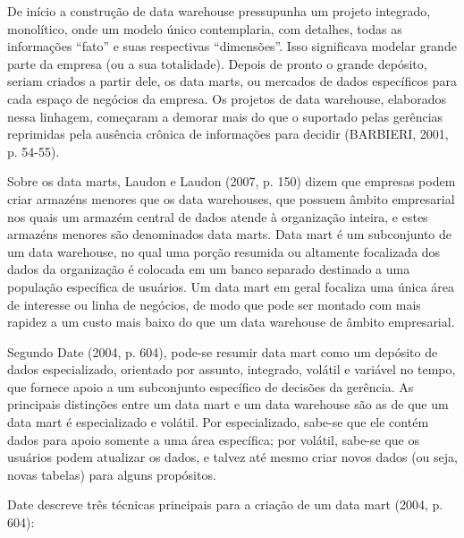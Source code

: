 \documentclass[a4paper]{article}
\begin{document}
{
\textsf{De in\'icio a constru\c{c}\~ao de data warehouse pressupunha um projeto integrado, monol\'itico, onde um modelo
\'unico contemplaria, com detalhes, todas as informa\c{c}\~oes ``fato'' e suas respectivas ``dimens\~oes''. Isso
significava modelar grande parte da empresa (ou a sua totalidade). Depois de pronto o grande dep\'osito, seriam criados
a partir dele, os data marts, ou mercados de dados espec\'ificos para cada espa\c{c}o de neg\'ocios da empresa. Os
projetos de data warehouse, elaborados nessa linhagem, come\c{c}aram a demorar mais do que o suportado pelas
ger\^encias reprimidas pela aus\^encia cr\^onica de informa\c{c}\~oes para decidir (BARBIERI, 2001, p. 54-55).}}

{
\textsf{Sobre os data marts, Laudon e Laudon (2007, p. 150) dizem que empresas podem criar armaz\'ens menores que os
data warehouses, que possuem \^ambito empresarial nos quais um armaz\'em central de dados atende \`a organiza\c{c}\~ao
inteira, e estes }\textsf{armaz\'ens menores s\~ao denominados data marts. Data mart \'e um subconjunto de um data
warehouse, no qual uma por\c{c}\~ao resumida ou altamente focalizada dos dados da organiza\c{c}\~ao \'e colocada em um
banco separado destinado a uma popula\c{c}\~ao espec\'ifica de usu\'arios. Um data mart em geral focaliza uma \'unica
\'area de interesse ou linha de neg\'ocios, de modo que pode ser montado com mais rapidez a um custo mais baixo do que
um data warehouse de \^ambito empresarial.}}

{\sffamily
Segundo Date (2004, p. 604), pode-se resumir data mart como um dep\'osito de dados especializado, orientado por assunto,
integrado, vol\'atil e vari\'avel no tempo, que fornece apoio a um subconjunto espec\'ifico de decis\~oes da
ger\^encia. As principais distin\c{c}\~oes entre um data mart e um data warehouse s\~ao as de que um data mart \'e
especializado e vol\'atil. Por especializado, sabe-se que ele cont\'em dados para apoio somente a uma \'area
espec\'ifica; por vol\'atil, sabe-se que os usu\'arios podem atualizar os dados, e talvez at\'e mesmo criar novos dados
(ou seja, novas tabelas) para alguns prop\'ositos.}

{
\textsf{Date descreve tr\^es t\'ecnicas principais para a cria\c{c}\~ao de um data mart (2004, p. 604):}}
\end{document}
